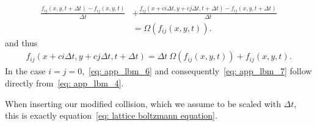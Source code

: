 \begin{equation}
  \label{eq: app_lbm_6}
  \begin{aligned}
    \frac{f_{ij}(x,y, t+\Delta t) - f_{ij}(x,y, t)}{\Delta t}
    & + \frac{f_{ij}\left(x + ci\Delta t, y+ cj\Delta t, t+\Delta t\right) - f_{ij}(x,y, t+\Delta t)}{\Delta t}
    \\&
    = \Omega\left(f_{ij}(x,y,t)\right).
  \end{aligned}
\end{equation}
and thus
\begin{equation}
  \label{eq: app_lbm_7}
  \begin{aligned}
    f_{ij}\left(x + ci\Delta t, y+ cj\Delta t, t+\Delta t\right)
    = \Delta t\ \Omega\left(f_{ij}(x,y,t)\right) + f_{ij}(x,y, t).
  \end{aligned}
\end{equation}
In the case $i=j=0$,~\eqref{eq: app_lbm_6} and consequently~\eqref{eq: app_lbm_7} follow directly from~\eqref{eq: app_lbm_4}.

When inserting our modified collision, which we assume to be scaled with $\Delta t$, this is exactly equation~\eqref{eq: lattice boltzmann equation}.
